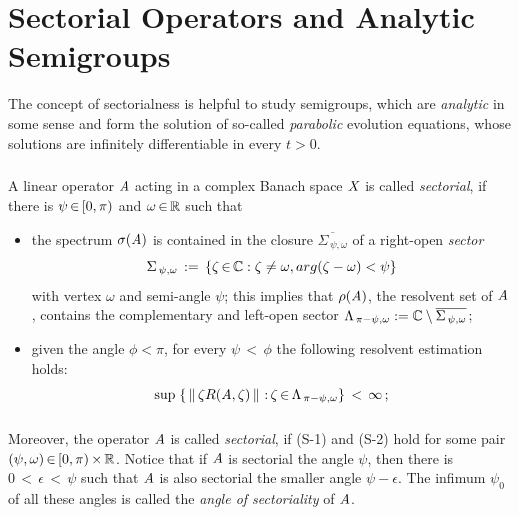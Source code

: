 \documentclass[11pt,twoside]{article}
\begin{document}
\section{Sectorial Operators and Analytic Semigroups}                          %
The concept of sectorialness is helpful to study semigroups,
which are \textit{analytic} in some sense and form the solution of so-called
\textit{parabolic} evolution equations,
whose solutions are infinitely differentiable in every $t > 0$.

\subparagraph{} %
A linear operator $\mathit{A}$ acting in a complex Banach space $\mathit{X}$
is called \textit{sectorial},
if there is $\psi {\,\in\,} [0,\pi)$ and $\omega {\,\in\,} {\mathbb{R}}$ such that

\begin{itemize}[leftmargin=9mm]
\item[(S-1)]
the spectrum $\sigma(\mathit{A})$ is contained in the closure
$\overline{\Sigma_{\,\psi,\omega} }$ of a right-open \textit{sector}
\[
\Sigma_{\,\psi,\omega} \,:=\,
\{\zeta {\,\in\,} {\mathbb{C}}: \zeta \neq \omega, arg(\zeta-\omega) < \psi\}
\]
with vertex $\omega$ and semi-angle $\psi$;
this implies that 
$\rho(\mathit{A})$,
the resolvent set of $\mathit{A}$,
contains the complementary and left-open sector
$\Lambda_{\,\pi-\psi,\omega} :=
{\mathbb{C}} \setminus \overline{ \Sigma_{\,\psi,\omega} }$;

\item[(S-2)]
given the angle $\phi < \pi$,
for every $\psi {\,<\,} \phi$
the following resolvent estimation holds:
\begin{equation}\label{RESOLVENT_ESTIMATE_II}
\sup \;
\{\, \left\lVert \,\zeta R(\mathit{A},\zeta)\, \right\rVert {\,:\,}
  \zeta {\,\in\,} \Lambda_{\,\pi-\psi,\omega}
\}
\, < \, \infty\,;
\end{equation}
\end{itemize}

\subparagraph{}
Moreover,
the operator $\mathit{A}$ is called \textit{sectorial},
if (S-1) and (S-2) hold for some pair $(\psi,\omega) {\,\in\,} [0,\pi) {\,\times\,} {\mathbb{R}}$.
Notice that
if $\mathit{A}$ is sectorial {\wrt} the angle $\psi$,
then there is $0 {\,<\,} \epsilon {\,<\,} \psi$
such that $\mathit{A}$ is also sectorial {\wrt} the smaller angle $\psi - \epsilon$.
The infimum $\psi_0$ of all these angles is called
the \textit{angle of sectoriality} of $\mathit{A}$.
\end{document}
